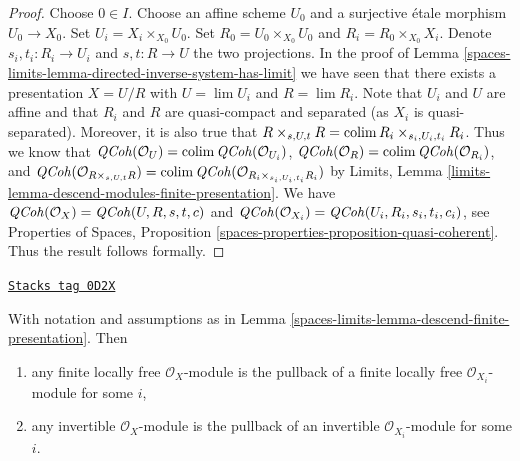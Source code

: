 \begin{proof}
Choose $0 \in I$. Choose an affine scheme $U_0$ and a surjective
\'etale morphism $U_0 \to X_0$. Set $U_i = X_i \times_{X_0} U_0$.
Set $R_0 = U_0 \times_{X_0} U_0$ and $R_i = R_0 \times_{X_0} X_i$.
Denote $s_i, t_i : R_i \to U_i$ and $s, t : R \to U$ the two
projections. In the proof of
Lemma \ref{spaces-limits-lemma-directed-inverse-system-has-limit} we have
seen that there exists a presentation $X = U/R$ with
$U = \lim U_i$ and $R = \lim R_i$. Note that $U_i$ and $U$ are affine and
that $R_i$ and $R$ are quasi-compact and separated (as $X_i$ is
quasi-separated). Moreover, it is also true that
$R \times_{s, U, t} R = \operatorname{colim} R_i \times_{s_i, U_i, t_i} R_i$.
Thus we know that
$\mathit{QCoh}(\mathcal{O}_U) = \operatorname{colim} \mathit{QCoh}(\mathcal{O}_{U_i})$,
$\mathit{QCoh}(\mathcal{O}_R) = \operatorname{colim} \mathit{QCoh}(\mathcal{O}_{R_i})$,
and
$\mathit{QCoh}(\mathcal{O}_{R \times_{s, U, t} R}) =
\operatorname{colim} \mathit{QCoh}(\mathcal{O}_{R_i \times_{s_i, U_i, t_i} R_i})$ by
Limits, Lemma \ref{limits-lemma-descend-modules-finite-presentation}.
We have $\mathit{QCoh}(\mathcal{O}_X) = \mathit{QCoh}(U, R, s, t, c)$ and
$\mathit{QCoh}(\mathcal{O}_{X_i}) = \mathit{QCoh}(U_i, R_i, s_i, t_i, c_i)$,
see Properties of Spaces, Proposition
\ref{spaces-properties-proposition-quasi-coherent}.
Thus the result follows formally.
\end{proof}

\begin{lemma}
\label{spaces-limits-lemma-descend-invertible-modules}
\href{https://stacks.math.columbia.edu/tag/0D2X}{\texttt{Stacks tag 0D2X}}

With notation and assumptions as in
Lemma \ref{spaces-limits-lemma-descend-finite-presentation}. Then
\begin{enumerate}
\item any finite locally free $\mathcal{O}_X$-module is the pullback
of a finite locally free $\mathcal{O}_{X_i}$-module for some $i$,
\item any invertible $\mathcal{O}_X$-module is the pullback of an invertible
$\mathcal{O}_{X_i}$-module for some $i$.
\end{enumerate}
\end{lemma}

